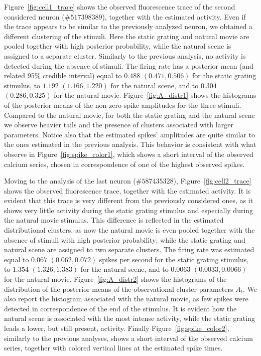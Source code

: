 Figure~\ref{fig:cell1_trace} shows the observed fluorescence trace of the second considered neuron ($\#517398389$), together with the estimated activity.
Even if the trace appears to be similar to the previously analyzed neuron, we obtained a different clustering of the stimuli. Here the static grating and natural movie are pooled together with high posterior probability, while the natural scene is assigned to a separate cluster. Similarly to the previous analysis, no activity is detected during the absence of stimuli.
The firing rate has a posterior mean (and related 95\% credible interval) equal to $0.488$ $(0.471, 0.506)$ for the static grating stimulus, to $1.192$ $(1.166, 1.220)$ for the natural scene, and to $0.304$ $(0.286, 0.325)$ for the natural movie.
Figure~\ref{fig:A_distr1} shows the histograms of the posterior means of the non-zero spike amplitudes for the three stimuli. Compared to the natural movie, for both the static grating and the natural scene we observe heavier tails and the presence of clusters associated with larger parameters. Notice also that the estimated spikes' amplitudes are quite similar to the ones estimated in the previous analysis.
This behavior is consistent with what observe in Figure~\ref{fig:spike_color1}, which shows a short interval of the observed calcium series, chosen in correspondence of one of the highest observed spikes. 


Moving to the analysis of the last neuron ($\#587435328$), Figure~\ref{fig:cell2_trace} shows the observed fluorescence trace, together with the estimated activity.
It is evident that this trace is very different from the previously considered ones, as it shows very little activity during the static grating stimulus and especially during the natural movie stimulus. This difference is reflected in the estimated distributional clusters, as now the natural movie is even pooled together with the absence of stimuli with high posterior probability; while the static grating and natural scene are assigned to two separate clusters.
The firing rate was estimated equal to $0.067$ $(0.062, 0.072)$ spikes per second for the static grating stimulus, to $1.354$ $(1.326, 1.383)$ for the natural scene, and to $0.0063$ $(0.0033, 0.0066)$ for the natural movie.
Figure~\ref{fig:A_distr2} shows the histograms of the distribution of the posterior means of the observational cluster parameters $A_t$.
We also report the histogram associated with the natural movie, as few spikes were detected in correspondence of the end of the stimulus. It is evident how the natural scene is associated with the most intense activity, while the static grating leads a lower, but still present, activity. 
Finally Figure~\ref{fig:spike_color2}, similarly to the previous analyses, shows a short interval of the observed calcium series, together with colored vertical lines at the estimated spike times. 

